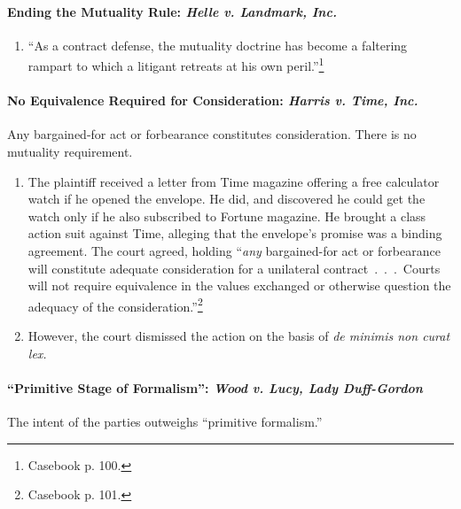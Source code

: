 \paragraph{Ending the Mutuality Rule: \emph{Helle v. Landmark, Inc.}}

\begin{enumerate}
    \item ``As a contract defense, the mutuality doctrine has become a 
    faltering rampart to which a litigant retreats at his own 
    peril.''\footnote{Casebook p. 100.}
\end{enumerate}

\paragraph{No Equivalence Required for Consideration: \emph{Harris v. Time, 
Inc.}}

Any bargained-for act or forbearance constitutes consideration. There is no 
mutuality requirement.

\begin{enumerate}
    \item The plaintiff received a letter from Time magazine offering a free 
    calculator watch if he opened the envelope. He did, and discovered he 
    could get the watch only if he also subscribed to Fortune magazine. He 
    brought a class action suit against Time, alleging that the envelope's 
    promise was a binding agreement. The court agreed, holding ``\emph{any} 
    bargained-for act or forbearance will constitute adequate consideration 
    for a unilateral contract~.~.~.~Courts will not require equivalence in the 
    values exchanged or otherwise question the adequacy of the 
    consideration.''\footnote{Casebook p. 101.}
    \item However, the court dismissed the action on the basis of \emph{de 
    minimis non curat lex.}
\end{enumerate}

\paragraph{``Primitive Stage of Formalism'': \emph{Wood v. Lucy, Lady 
Duff-Gordon}}

The intent of the parties outweighs ``primitive formalism.''

